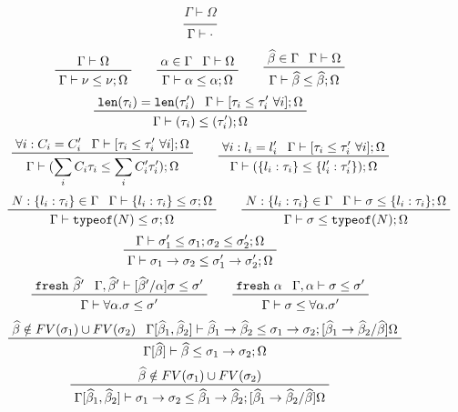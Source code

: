 \documentclass[letterpaper]{article}
\newcommand{\utv}{\alpha}             %
\newcommand{\etv}{\widehat{\beta}}    %
\begin{document}
\begin{figure}
  $$ \boxed{\Gamma\vdash\Omega} $$
  $$ $$
  $$ \prfaxiom{\Gamma\vdash\cdot} $$
  $$ \prftree{\prfassumption{\Gamma\vdash\Omega}}
             {\prfassumption{\Gamma\vdash\nu\leq\nu;\Omega}}\qquad
     \prftree{\prfassumption{\utv\in\Gamma}}
             {\prfassumption{\Gamma\vdash\Omega}}
             {\Gamma\vdash\utv\leq\utv;\Omega}\qquad
     \prftree{\prfassumption{\etv\in\Gamma}}
             {\prfassumption{\Gamma\vdash\Omega}}
             {\Gamma\vdash\etv\leq\etv;\Omega} $$
  $$ \prftree{\prfassumption{\texttt{len}(\tau_i)=\texttt{len}(\tau'_i)}}
             {\prfassumption{\Gamma\vdash[\tau_i\leq\tau'_i\ \forall i];\Omega}}
             {\Gamma\vdash(\tau_i)\leq(\tau'_i);\Omega} $$
  $$ \prftree{\prfassumption{\forall i:C_i=C'_i}}
             {\prfassumption{\Gamma\vdash[\tau_i\leq\tau'_i\ \forall i];\Omega}}
             {\Gamma\vdash(\sum_iC_i\tau_i\leq\sum_iC'_i\tau'_i);\Omega}\qquad
     \prftree{\prfassumption{\forall i:l_i=l'_i}}
             {\prfassumption{\Gamma\vdash[\tau_i\leq\tau'_i\ \forall i];\Omega}}
             {\Gamma\vdash(\{l_i:\tau_i\}\leq\{l'_i:\tau'_i\});\Omega} $$
  $$ \prftree{\prfassumption{N:\{l_i:\tau_i\}\in\Gamma}}
             {\prfassumption{\Gamma\vdash\{l_i:\tau_i\}\leq\sigma};\Omega}
             {\Gamma\vdash\texttt{typeof}(N)\leq\sigma;\Omega}\qquad
     \prftree{\prfassumption{N:\{l_i:\tau_i\}\in\Gamma}}
             {\prfassumption{\Gamma\vdash\sigma\leq\{l_i:\tau_i\};\Omega}}
             {\Gamma\vdash\sigma\leq\texttt{typeof}(N);\Omega} $$
  $$ \prftree{\prfassumption{\Gamma\vdash\sigma'_1\leq\sigma_1;\sigma_2\leq\sigma'_2;\Omega}}
             {\Gamma\vdash\sigma_1\rightarrow\sigma_2\leq\sigma'_1\rightarrow\sigma'_2;\Omega} $$
  $$ \prftree{\prfassumption{\texttt{fresh}\ \etv'}}
             {\prfassumption{\Gamma,\etv'\vdash[\etv'/\utv]\sigma\leq\sigma'}}
             {\Gamma\vdash\forall\utv.\sigma\leq\sigma'}\qquad
     \prftree{\prfassumption{\texttt{fresh}\ \utv}}
             {\prfassumption{\Gamma,\utv\vdash\sigma\leq\sigma'}}
             {\Gamma\vdash\sigma\leq\forall\utv.\sigma'} $$
  $$ \prftree{\prfassumption{\etv\notin FV(\sigma_1)\cup FV(\sigma_2)}}
             {\prfassumption{\Gamma[\etv_1,\etv_2]\vdash\etv_1\rightarrow\etv_2\leq\sigma_1\rightarrow\sigma_2;[\etv_1\rightarrow\etv_2/\etv]\Omega}}
             {\Gamma[\etv]\vdash\etv\leq\sigma_1\rightarrow\sigma_2;\Omega} $$
  $$ \prftree{\prfassumption{\etv\notin FV(\sigma_1)\cup FV(\sigma_2)}}
             {\prfassumption{\Gamma[\etv_1,\etv_2]\vdash\sigma_1\rightarrow\sigma_2\leq\etv_1\rightarrow\etv_2;[\etv_1\rightarrow\etv_2/\etv]\Omega}}
$$
\end{figure}
\end{document}
